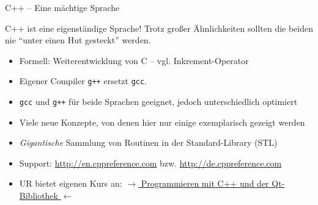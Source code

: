
\begin{frame}[t,plain]
\titlepage
\end{frame}


\begin{frame}{C++ -- Eine mächtige Sprache}
%
\begin{warnbox}
C++ ist eine eigenständige Sprache! Trotz großer Ähnlichkeiten sollten die beiden nie \enquote{unter einen Hut gesteckt} werden.
\end{warnbox}
%
\begin{itemize}
\item Formell: Weiterentwicklung von C -- vgl. Inkrement-Operator
\item Eigener Compiler \texttt{g++} ersetzt \texttt{gcc}.
\item \texttt{gcc} und \texttt{g++} für beide Sprachen geeignet, jedoch unterschiedlich optimiert
\item Viele neue Konzepte, von denen hier nur einige exemplarisch gezeigt werden
\item \emph{Gigantische} Sammlung von Routinen in der Standard-Library (STL)
\item Support: \url{http://en.cppreference.com} bzw. \url{http://de.cppreference.com}
\item UR bietet eigenen Kurs an:
	\href{http://www.physik.uni-regensburg.de/studium/it/c++kurs/}
	{$\rightarrow$ Programmieren mit C++ und der Qt-Bibliothek $\leftarrow$}
\end{itemize}
%
\end{frame}



